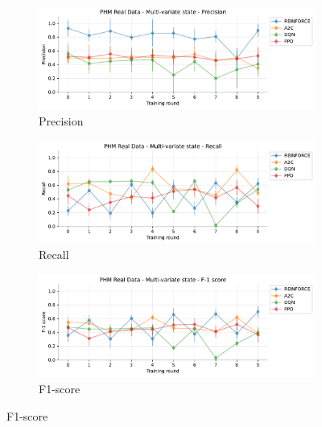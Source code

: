 \documentclass[a4paper, 12pt]{article}
\begin{document}
\begin{figure}[ht]
	\begin{subfigure}{\textwidth}
		\centering
		\includegraphics[width=\linewidth]{Multivariate_Pr.pdf}  
		\caption{Precision}
		\label{fig:tr-ms-pr}
	\end{subfigure} \par\smallskip
	
	\begin{subfigure}{\textwidth}
		\centering
		\includegraphics[width=\linewidth]{Multivariate_Rc.pdf}  
		\caption{Recall}
		\label{fig:tr-ms-rc}
	\end{subfigure} \par\smallskip
	
	\begin{subfigure}{\textwidth}
		\centering
		\includegraphics[width=\linewidth]{Multivariate_F1.pdf}  
		\caption{F1-score}
		\label{fig:tr-ms-f1}
	\end{subfigure} \par\smallskip
	

\end{figure}
\end{document}
